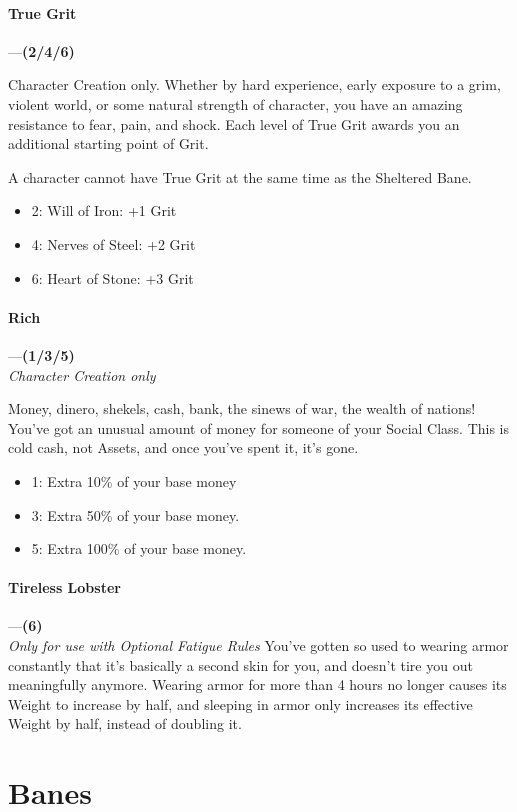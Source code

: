 \documentclass[oneside,11pt,english]{book}
\begin{document}
\paragraph{\label{boon:True Grit}True Grit}---\quad\textbf{(2/4/6) }\par
Character Creation only. 
Whether by hard experience, early exposure to a grim, violent world, or some natural strength of 
character, you have an amazing resistance to fear, pain, and shock. Each level of True Grit awards you an 
additional starting point of Grit. 


A character cannot have True Grit at the same time as the Sheltered Bane. 
\begin{itemize}
\item 2: Will of Iron: +1 Grit 
\item 4: Nerves of Steel: +2 Grit 
\item 6: Heart of Stone: +3 Grit 
\end{itemize}
\paragraph{\label{boon:Rich}Rich}---\quad\textbf{(1/3/5) }\\
\textit{Character Creation only}\par
Money, dinero, shekels, cash, bank, the sinews of war, the wealth of nations! You've got an unusual 
amount of money for someone of your Social Class. This is cold cash, not Assets, and once you've spent 
it, it's gone. 
\begin{itemize}
\item 1: Extra 10\% of your base money 
\item 3: Extra 50\% of your base money. 
\item 5: Extra 100\% of your base money. 
\end{itemize}
\paragraph{\label{boon:Tireless Lobster}Tireless Lobster}---\quad\textbf{(6)}\\
\textit{Only for use with Optional Fatigue Rules}
You’ve gotten so used to wearing armor constantly that it’s basically a second skin for you, and doesn’t tire you out meaningfully anymore. Wearing armor for more than 4 hours no longer causes its Weight to increase by half, and sleeping in armor only increases its effective Weight by half, instead of doubling it.

\section{Banes}
\end{document}
